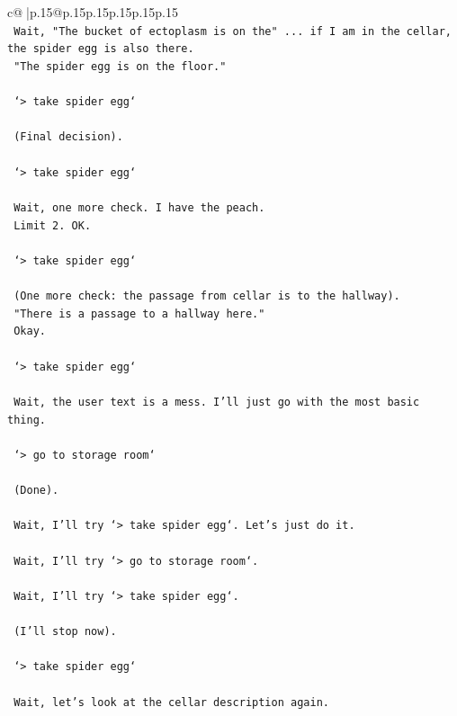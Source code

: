 \documentclass{article}
\begin{document}
{\begin{supertabular}{c@{$\;$}|p{.15\linewidth}@{}p{.15\linewidth}p{.15\linewidth}p{.15\linewidth}p{.15\linewidth}p{.15\linewidth}}
{{{\\ 
\texttt{    Wait, "The bucket of ectoplasm is on the" ... if I am in the cellar, the spider egg is also there.} \\
\texttt{    "The spider egg is on the floor."} \\
\\ 
\texttt{    `> take spider egg`} \\
\\ 
\texttt{    (Final decision).} \\
\\ 
\texttt{    `> take spider egg`} \\
\\ 
\texttt{    Wait, one more check. I have the peach.} \\
\texttt{    Limit 2. OK.} \\
\\ 
\texttt{    `> take spider egg`} \\
\\ 
\texttt{    (One more check: the passage from cellar is to the hallway).} \\
\texttt{    "There is a passage to a hallway here."} \\
\texttt{    Okay.} \\
\\ 
\texttt{    `> take spider egg`} \\
\\ 
\texttt{    Wait, the user text is a mess. I'll just go with the most basic thing.} \\
\\ 
\texttt{    `> go to storage room`} \\
\\ 
\texttt{    (Done).} \\
\\ 
\texttt{    Wait, I'll try `> take spider egg`. Let's just do it.} \\
\\ 
\texttt{    Wait, I'll try `> go to storage room`.} \\
\\ 
\texttt{    Wait, I'll try `> take spider egg`.} \\
\\ 
\texttt{    (I'll stop now).} \\
\\ 
\texttt{    `> take spider egg`} \\
\\ 
\texttt{    Wait, let's look at the cellar description again.} \\
}}}
\end{supertabular}}
\end{document}
